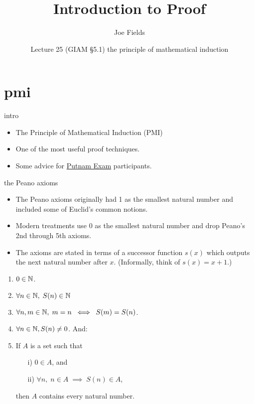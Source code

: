 \documentclass[handout,landscape]{beamer}
\author{Joe Fields}
\title{Introduction to Proof}
\date[Lecture 25 (GIAM \S 5.1)]{Lecture 25 (GIAM \S 5.1) \newline the principle of mathematical induction}
\institute[SCSU]{ {\tt fieldsj1@southernct.edu} }
\begin{document}
\begin{frame}[plain]
  \titlepage
\end{frame}

\section{pmi}

\begin{frame}{intro}
\begin{itemize}
\item The Principle of Mathematical Induction (PMI) \pause
\item One of the most useful proof techniques. \pause
\item Some advice for \href{https://www.maa.org/math-competitions/putnam-competition}{Putnam Exam} participants.
\end{itemize}
\end{frame}


\begin{frame}{the Peano axioms}
\begin{itemize}
\item The Peano axioms originally had 1 as the smallest natural number and included some of Euclid's common notions. \pause
\item Modern treatments use 0 as the smallest natural number and drop Peano's 2nd through 5th axioms. \pause 
\item The axioms are stated in terms of a successor function $s(x)$ which outputs the next natural number after $x$. \pause \newline (Informally, think of $s(x) = x+1$.) \pause
\end{itemize}
\begin{enumerate}
\item $0\in {\mathbb N}$. \pause
\item $\forall n \in {\mathbb N}, \; S(n) \in {\mathbb N}$ \pause
\item $\forall n, m \in {\mathbb N}, \; m = n \; \iff \; S(m) = S(n)$. \pause
\item $\forall n \in {\mathbb N}, S(n) \neq 0$.\pause \newline
And: \pause
\item If $A$ is a set such that
\begin{enumerate}
\item[i)] $0 \in A$, and
\item[ii)]  $\forall n, \; n \in A \; \implies \; S(n) \in A$,
\end{enumerate}
then $A$ contains every natural number.
\end{enumerate}
\end{frame}
\end{document}
